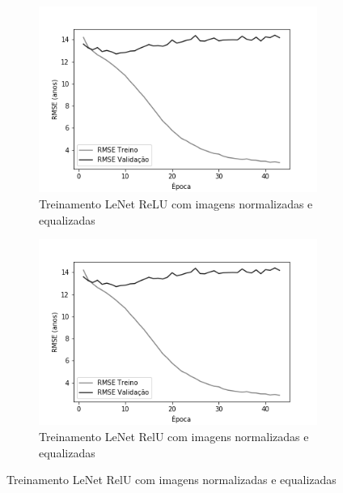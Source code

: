 \begin{figure}[hb!]
\begin{subfigure}[hb]{0.5\linewidth}
    \caption{Treinamento LeNet ReLU com imagens normalizadas e equalizadas}
    \label{fig:redeneuralbiologica}
    \includegraphics[width=\linewidth]{img/graficos-fase2/fig-history-lenet-relu-data-augmentation-2-1.png}%
  \end{subfigure}%
  \begin{subfigure}[hb]{0.5\linewidth}
    \caption{Treinamento LeNet RelU com imagens normalizadas e equalizadas}
    \label{fig:redeneuralbiologica}
    \includegraphics[width=\linewidth]{img/graficos-fase2/fig-history-lenet-relu-data-augmentation-2-1.png}
  \end{subfigure}%
\end{figure}


